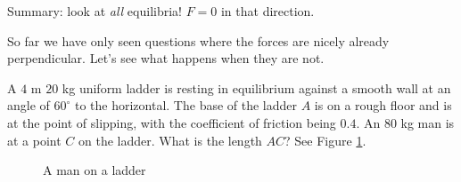 Summary: look at \emph{all} equilibria! $F=0$ in that direction.

So far we have only seen questions where the forces are nicely already perpendicular. Let's see what happens when they are not.


\begin{example}
    A $4$ m $20$ kg uniform ladder is resting in equilibrium against a smooth wall at an angle of $60^\circ$ to the horizontal. The base of the ladder $A$ is on a rough floor and is at the point of slipping, with the coefficient of friction being $0.4$. 
    An $80$ kg man is at a point $C$ on the ladder. What is the length $AC$? See Figure \ref{fig:man_on_ladder}.
    \begin{figure}[H]
    \centering
    \caption{A man on a ladder}
    \label{fig:man_on_ladder}
    \end{figure}

\end{example}
